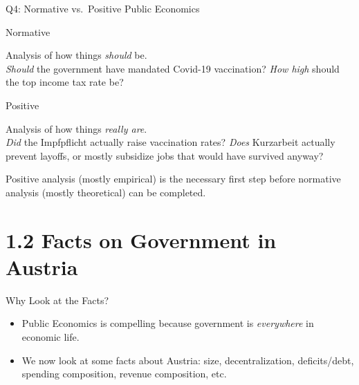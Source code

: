 \documentclass[11pt,aspectratio=169]{beamer}
\begin{document}
\begin{frame}{Q4: Normative vs.\ Positive Public Economics}
  \begin{block}{Normative}

    Analysis of how things \emph{should} be. \\
    \emph{Should} the government have mandated Covid-19 vaccination? \emph{How high} should the top income tax rate be?
  \end{block}
  \begin{block}{Positive}

    Analysis of how things \emph{really are}. \\
    \emph{Did} the Impfpflicht actually raise vaccination rates? \emph{Does} Kurzarbeit actually prevent layoffs, or mostly subsidize jobs that would have survived anyway?
  \end{block}
  \vspace{0.5em}
  \centering
  \alert{Positive analysis (mostly empirical) is the necessary first step before normative analysis (mostly theoretical) can be completed.}
\end{frame}

\section{1.2 Facts on Government in Austria}

\begin{frame}{Why Look at the Facts?}
  \begin{itemize}
    \item Public Economics is compelling because government is \emph{everywhere} in economic life.
    \item We now look at some facts about Austria: size, decentralization, deficits/debt, spending composition, revenue composition, etc.
 

  \end{itemize}
\end{frame}
\end{document}
